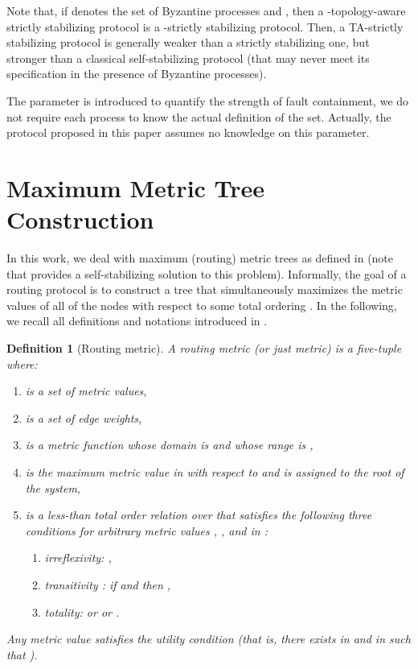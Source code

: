 \documentclass[11pt]{article}
\newtheorem{defi}{Definition}
\newenvironment{definition}[1]{\vspace{-0.25cm}\begin{defi}#1}{\end{defi}\vspace{-0.3cm}}
\begin{document}
Note that, if  denotes the set of Byzantine processes and , then a -topology-aware strictly stabilizing protocol is a -strictly stabilizing protocol. Then, a TA-strictly stabilizing protocol is generally weaker than a strictly stabilizing one, but stronger than a classical self-stabilizing protocol (that may never meet its specification in the presence of Byzantine processes).

The parameter  is introduced to quantify the strength of fault containment, we do not require each process to know the actual definition of the set. Actually, the protocol proposed in this paper assumes no knowledge on this parameter.

\section{Maximum Metric Tree Construction}

In this work, we deal with maximum (routing) metric trees as defined in \cite{GS03j} (note that \cite{GS99c} provides a self-stabilizing solution to this problem). Informally, the goal of a routing protocol is to construct a tree that simultaneously maximizes the metric values of all of the nodes with respect to some total ordering . In the following, we recall all definitions and notations introduced in \cite{GS03j}. 

\begin{definition}[Routing metric]
A \emph{routing metric} (or just \emph{metric}) is a five-tuple   where:
\begin{enumerate}
\item  is a set of metric values,
\item  is a set of edge weights,
\item  is a metric function whose domain is  and whose range is ,
\item  is the maximum metric value in  with respect to  and is assigned to the root of the system,
\item  is a less-than total order relation over  that satisfies the following three conditions for arbitrary metric values , , and  in :
\begin{enumerate}
\item irreflexivity: ,
\item transitivity : if  and  then ,
\item totality:  or  or .
\end{enumerate}
\end{enumerate}
Any metric value  satisfies the \emph{utility condition} (that is, there exists  in  and  in  such that ).
\end{definition}
\end{document}
